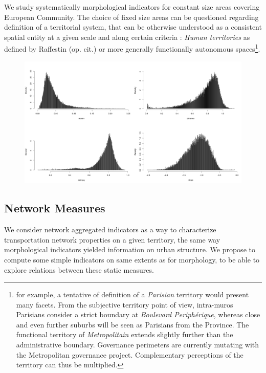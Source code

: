 We study systematically morphological indicators for constant size areas covering European Community. The choice of fixed size areas can be questioned regarding definition of a territorial system, that can be otherwise understood as a consistent spatial entity at a given scale and along certain criteria : \emph{Human territories} as defined by Raffestin (op. cit.) or more generally functionally autonomous spaces\footnote{for example, a tentative of definition of a \textit{Parisian} territory would present many facets. From the subjective territory point of view, intra-muros Parisians consider a strict boundary at \textit{Boulevard Periph{\'e}rique}, whereas close and even further suburbs will be seen as Parisians from the Province. The functional territory of \textit{Metropolitain} extends slightly further than the administrative boundary. Governance perimeters are currently mutating with the Metropolitan governance project. Complementary perceptions of the territory can thus be multiplied.}.





\begin{figure}
\includegraphics[width=1.2\textwidth]{Figures/PartII/Empirical/Static/Density/hists_GOOD}
\caption{}
\end{figure}



\subsection{Network Measures}

We consider network aggregated indicators as a way to characterize transportation network properties on a given territory, the same way morphological indicators yielded information on urban structure. We propose to compute some simple indicators on same extents as for morphology, to be able to explore relations between these static measures.

